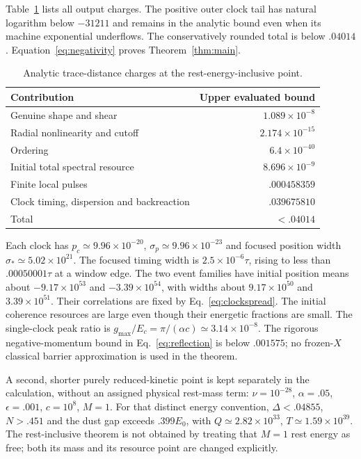 \documentclass[11pt]{article}
\begin{document}
Table~\ref{tab:errors} lists all output charges.
The positive outer clock tail has natural logarithm below $-31211$ and remains in the analytic bound even when its machine exponential underflows.
The conservatively rounded total is below $.04014$.
Equation~\eqref{eq:negativity} proves Theorem~\ref{thm:main}.

\begin{table}[htbp]
\centering
\caption{Analytic trace-distance charges at the rest-energy-inclusive point.}
\label{tab:errors}
\begin{tabular}{@{}lr@{}}
\toprule
Contribution&Upper evaluated bound\\
\midrule
Genuine shape and shear&$1.089\times10^{-8}$\\
Radial nonlinearity and cutoff&$2.174\times10^{-15}$\\
Ordering&$6.4\times10^{-40}$\\
Initial total spectral resource&$8.696\times10^{-9}$\\
Finite local pulses&$.000458359$\\
Clock timing, dispersion and backreaction&$.039675810$\\
\midrule
Total&$<.04014$\\
\bottomrule
\end{tabular}
\end{table}

Each clock has $p_c\simeq9.96\times10^{-20}$, $\sigma_p\simeq9.96\times10^{-23}$ and focused position width $\sigma_*\simeq5.02\times10^{21}$.
The focused timing width is $2.5\times10^{-6}\tau$, rising to less than $.00050001\tau$ at a window edge.
The two event families have initial position means about $-9.17\times10^{53}$ and $-3.39\times10^{54}$, with widths about $9.17\times10^{50}$ and $3.39\times10^{51}$.
Their correlations are fixed by Eq.~\eqref{eq:clockspread}.
The initial coherence resources are large even though their energetic fractions are small.
The single-clock peak ratio is $g_{\max}/E_c=\pi/(\alpha c)\simeq3.14\times10^{-8}$.
The rigorous negative-momentum bound in Eq.~\eqref{eq:reflection} is below $.001575$; no frozen-$X$ classical barrier approximation is used in the theorem.

A second, shorter purely reduced-kinetic point is kept separately in the calculation, without an assigned physical rest-mass term: $\nu=10^{-28}$, $\alpha=.05$, $\epsilon=.001$, $c=10^8$, $M=1$.
For that distinct energy convention, $\Delta<.04855$, $N>.451$ and the dust gap exceeds $.399E_0$, with $Q\simeq2.82\times10^{33}$, $T\simeq1.59\times10^{39}$.
The rest-inclusive theorem is not obtained by treating that $M=1$ rest energy as free; both its mass and its resource point are changed explicitly.
\end{document}
